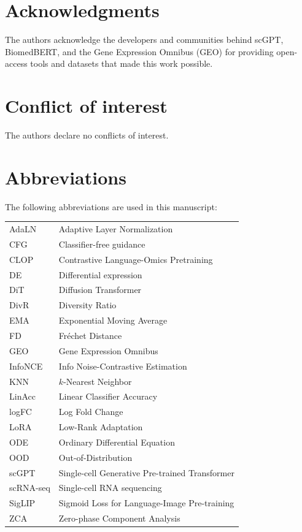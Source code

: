 \documentclass[preprint,12pt]{elsarticle}
\begin{document}
        \section*{Acknowledgments}
        The authors acknowledge the developers and communities behind scGPT, BiomedBERT, and the Gene Expression Omnibus (GEO) for providing open-access tools and datasets that made this work possible.

        \section*{Conflict of interest}
        The authors declare no conflicts of interest.

        \section*{Abbreviations}
        The following abbreviations are used in this manuscript:\\[2pt]
\noindent
\begin{tabular}{@{}ll}
AdaLN & Adaptive Layer Normalization\\
CFG & Classifier-free guidance\\
CLOP & Contrastive Language-Omics Pretraining\\
DE & Differential expression\\
DiT & Diffusion Transformer\\
DivR & Diversity Ratio\\
EMA & Exponential Moving Average\\
FD & Fr\'{e}chet Distance\\
GEO & Gene Expression Omnibus\\
InfoNCE & Info Noise-Contrastive Estimation\\
KNN & $k$-Nearest Neighbor\\
LinAcc & Linear Classifier Accuracy\\
logFC & Log Fold Change\\
LoRA & Low-Rank Adaptation\\
ODE & Ordinary Differential Equation\\
OOD & Out-of-Distribution\\
scGPT & Single-cell Generative Pre-trained Transformer\\
scRNA-seq & Single-cell RNA sequencing\\
SigLIP & Sigmoid Loss for Language-Image Pre-training\\
ZCA & Zero-phase Component Analysis
\end{tabular}
\end{document}
